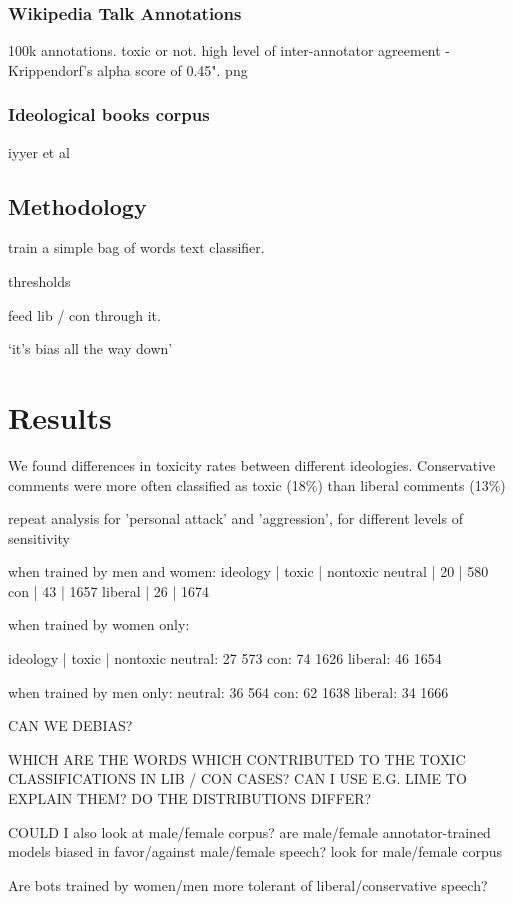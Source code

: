 \documentclass[sigconf]{acmart}
\begin{document}
\subsubsection{Wikipedia Talk Annotations}
100k annotations. toxic or not. high level of inter-annotator agreement - Krippendorf’s alpha score of 0.45".
png

\subsubsection{Ideological books corpus}
iyyer et al

\subsection{Methodology}
train a simple bag of words text classifier.

thresholds

feed lib / con through it.

‘it’s bias all the way down’

\section{Results}

We found differences in toxicity rates between different ideologies. Conservative comments were more often classified as toxic (18\%) than liberal comments (13\%)

repeat analysis for 'personal attack' and 'aggression', for different levels of sensitivity

when trained by men and women:
ideology | toxic | nontoxic
neutral | 20 | 580
con | 43 | 1657
liberal | 26 | 1674

when trained by women only:

ideology | toxic | nontoxic
neutral:
27
573
con:
74
1626
liberal:
46
1654

when trained by men only:
neutral:
36
564
con:
62
1638
liberal:
34
1666

CAN WE DEBIAS?

WHICH ARE THE WORDS WHICH CONTRIBUTED TO THE TOXIC CLASSIFICATIONS IN LIB / CON CASES? CAN I USE E.G. LIME TO EXPLAIN THEM? DO THE DISTRIBUTIONS DIFFER?

COULD I also look at male/female corpus? are male/female annotator-trained models biased in favor/against male/female speech? look for male/female corpus

Are bots trained by women/men more tolerant of liberal/conservative speech? 
\end{document}
